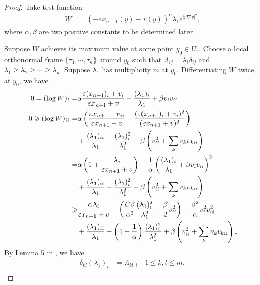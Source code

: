 \documentclass[reqno]{amsart}
\theoremstyle{remark}
\theoremstyle{definition}
\numberwithin{equation}{section}
\begin{document}
\begin{proof}
    Take test function
    \begin{align*}
        W &= \left( -\varepsilon x_{n+1}(y) - v(y) \right)^{\alpha} \lambda_1 e^{\frac{\beta}{2} |\nabla v|^2},
    \end{align*}
    where $\alpha, \beta$ are two positive constants to be determined later.

    Suppose $W$ achieves its maximum value at some point $y_0 \in U_r$. Choose a local orthonormal frame $\{\tau_1, \cdots, \tau_n\}$ around $y_0$ such that $\Lambda_{ij} = \lambda_i\delta_{ij}$ and $\lambda_1 \geqslant \lambda_2 \geqslant \cdots \geqslant \lambda_n$. Suppose $\lambda_1$ has multiplicity $m$ at $y_0$. Differentiating $W$ twice, at $y_0$, we have
    \begin{align}\label{Gauss1}
        0 = (\log W)_i =& \alpha \frac{\varepsilon (x_{n+1})_i + v_i}{\varepsilon x_{n+1} + v} + \frac{(\lambda_1)_i}{\lambda_1} + \beta v_iv_{ii} \\
        0 \geqslant (\log W)_{ii} 
        =& \alpha \left( \frac{\varepsilon x_{n+1} + v_{ii}}{\varepsilon x_{n+1} + v} - \frac{(\varepsilon (x_{n+1})_{i} + v_{i})^2}{(\varepsilon x_{n+1} + v)^2}  \right)
        \notag \\
        &+ \frac{(\lambda_1)_{ii}}{\lambda_1} - \frac{(\lambda_1)_{i}^2}{\lambda_1^2} 
        + \beta \left( v_{ii}^2 + \sum_k v_kv_{kii} \right) 
        \notag \\
        =& \alpha \left( 1 + \frac{\lambda_i}{\varepsilon x_{n+1} + v} \right) - \frac{1}{\alpha}\left( \frac{(\lambda_1)_i}{\lambda_1} + \beta v_{i}v_{ii} \right)^2 
        \notag \\
        &+ \frac{(\lambda_1)_{ii}}{\lambda_1} - \frac{(\lambda_1)_{i}^2}{\lambda_1^2} 
        + \beta \left( v_{ii}^2 + \sum_k v_kv_{kii} \right) 
        \notag \\
        \geqslant& 
        \frac{\alpha \lambda_i}{\varepsilon x_{n+1} + v} 
        - \left( \frac{C\beta}{\alpha^2}\frac{(\lambda_1)_{i}^2}{\lambda_1^2} + \frac{\beta}{2}v_{ii}^2 \right) - \frac{\beta^2}{\alpha}v_{i}^2v_{ii}^2 
        \notag \\
        &+ \frac{(\lambda_1)_{ii}}{\lambda_1} - \left( 1+\frac{1}{\alpha} \right)\frac{(\lambda_1)_{i}^2}{\lambda_1^2} 
        + \beta \left( v_{ii}^2 + \sum_k v_kv_{kii} \right). 
    \end{align}
    By Lemma 5 in \cite{brendle2017asymptotic}, we have
    \begin{align}
        \delta_{kl} \left( \lambda_1 \right)_i &= \Lambda_{kl,i} \quad 1 \leqslant k,l \leqslant m, \label{lambda 1st order} \\

\end{align}
\end{proof}
\end{document}
